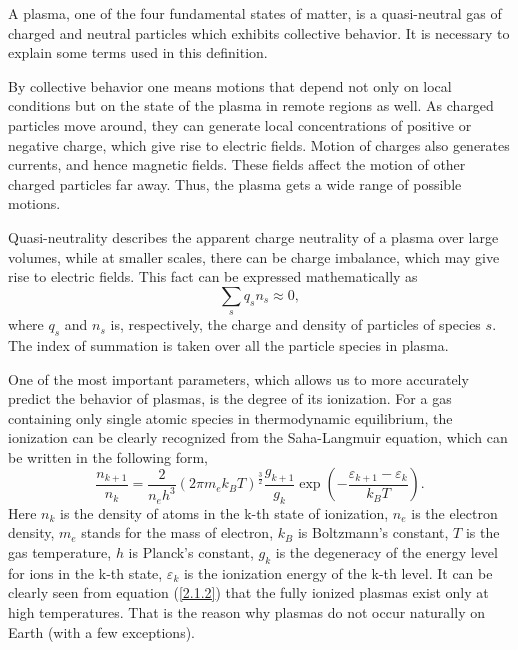A plasma, one of the four fundamental states of matter, is a quasi-neutral gas of charged and neutral particles which exhibits collective behavior. It is necessary to explain some terms used in this definition.

By collective behavior one means motions that depend not only on local conditions but on the state of the plasma in remote regions as well. As charged particles move around, they can generate local concentrations of positive or negative charge, which give rise to electric fields. Motion of charges also generates currents, and hence magnetic fields. These fields affect the motion of other charged particles far away. Thus, the plasma gets a wide range of possible motions.

Quasi-neutrality describes the apparent charge neutrality of a plasma over large volumes, while at smaller scales, there can be charge imbalance, which may give rise to electric fields. This fact can be expressed mathematically as
\begin{equation}
\label{2.1.1}
\sum_{s} q_s n_s \approx 0,
\end{equation}
where $ q_s $ and $ n_s $ is, respectively, the charge and density of particles of species $ s $. The index of summation is taken over all the particle species in plasma.

One of the most important parameters, which allows us to more accurately predict the behavior of plasmas, is the degree of its ionization. For a gas containing only single atomic species in thermodynamic equilibrium, the ionization can be clearly recognized from the Saha-Langmuir equation, which can be written in the following form,
\begin{equation}
\label{2.1.2}
\frac{n_{k+1}}{n_k} = \frac{2}{n_e h^3}\left(2\pi m_e k_B T\right)^{\frac{3}{2}} \frac{g_{k+1}}{g_k} \exp\left(-\frac{\varepsilon_{k+1} - \varepsilon_{k}}{k_{B} T} \right).
\end{equation}
Here $ n_k $ is the density of atoms in the k-th state of ionization, $ n_e $ is the electron density, $ m_e $ stands for the mass of electron, $ k_B $ is Boltzmann's constant, $ T $ is the gas temperature, $ h $ is Planck's constant, $ g_k $ is the degeneracy of the energy level for ions in the k-th state, $ \varepsilon_k $ is the ionization energy of the k-th level. It can be clearly seen from equation (\ref{2.1.2}) that the fully ionized plasmas exist only at high temperatures. That is the reason why plasmas do not occur naturally on Earth (with a few exceptions).


